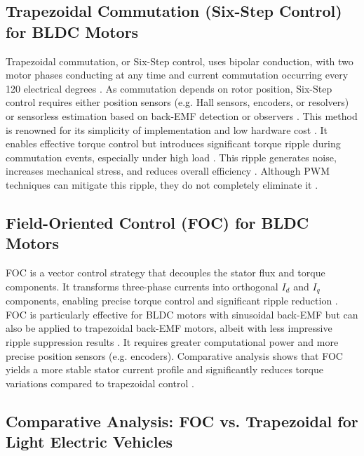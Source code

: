 \documentclass[conference]{IEEEtran}
\begin{document}
\subsection{Trapezoidal Commutation (Six-Step Control) for BLDC Motors}
Trapezoidal commutation, or Six-Step control, uses bipolar conduction, with two motor phases conducting at any time and 
current commutation occurring every 120 electrical degrees \cite{gieras_modern_2023}. As commutation depends on rotor 
position, Six-Step control requires either position sensors (e.g. Hall sensors, encoders, or resolvers) or sensorless 
estimation based on back-EMF detection or observers \cite{gieras_modern_2023, gasc_conception_2004}.  This method is 
renowned for its simplicity of implementation and low hardware cost \cite{bhatiya_bldc_2024}. It enables effective 
torque control but introduces significant torque ripple during commutation events, especially under high load 
\cite{jomsa-nga_torque_2024}. This ripple generates noise, increases mechanical stress, and reduces overall efficiency 
\cite{mohammd_taher_new_2021}. Although PWM techniques can mitigate this ripple, they do not completely eliminate it 
\cite{li_quantitative_2019}.

\subsection{Field-Oriented Control (FOC) for BLDC Motors}
FOC is a vector control strategy that decouples the stator flux and torque components. It transforms three-phase 
currents into orthogonal \( I_d \) and \( I_q \) components, enabling precise torque control and significant ripple 
reduction \cite{jomsa-nga_torque_2024}. FOC is particularly effective for BLDC motors with sinusoidal back-EMF but can 
also be applied to trapezoidal back-EMF motors, albeit with less impressive ripple suppression results 
\cite{li_quantitative_2019}. It requires greater computational power and more precise position sensors (e.g. encoders). 
Comparative analysis shows that FOC yields a more stable stator current profile and significantly reduces torque 
variations compared to trapezoidal control \cite{patil_analysis_2025}.

\subsection{Comparative Analysis: FOC vs. Trapezoidal for Light Electric Vehicles}
\end{document}
